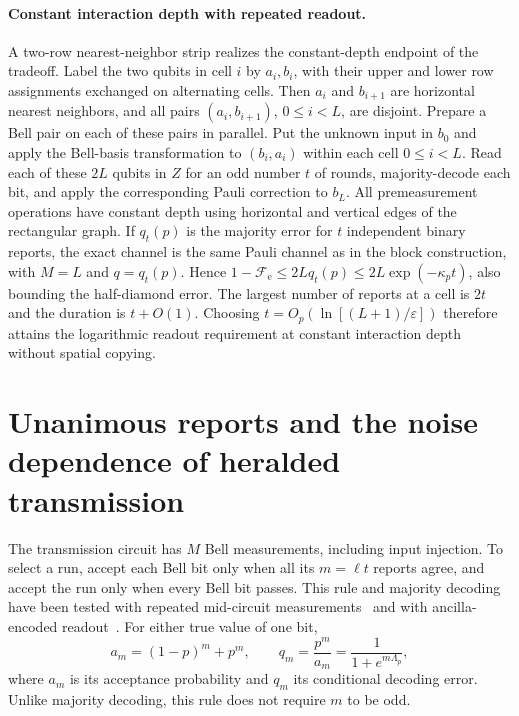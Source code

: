 \documentclass[aps,prl,twocolumn,superscriptaddress,longbibliography,reprint,floatfix]{revtex4-2}
\newcommand{\eps}{\varepsilon}
\newcommand{\Fe}{\mathcal F_{\mathrm e}}
\begin{document}
\paragraph*{Constant interaction depth with repeated readout.}
A two-row nearest-neighbor strip realizes the constant-depth endpoint of
the tradeoff. Label the two qubits in cell $i$ by $a_i,b_i$, with their
upper and lower row assignments exchanged on alternating cells. Then
$a_i$ and $b_{i+1}$ are horizontal nearest neighbors, and all pairs
$(a_i,b_{i+1})$, $0\le i<L$, are disjoint. Prepare a Bell pair on each of
these pairs in parallel. Put the unknown input in $b_0$ and apply the
Bell-basis transformation to $(b_i,a_i)$ within each cell
$0\le i<L$. Read each of these $2L$ qubits in $Z$ for an odd number $t$
of rounds, majority-decode each bit, and apply the corresponding Pauli
correction to $b_L$. All premeasurement operations have constant depth
using horizontal and vertical edges of the rectangular graph.
If $q_t(p)$ is the majority error for $t$ independent binary reports, the
exact channel is the same Pauli channel as in the block construction,
with $M=L$ and $q=q_t(p)$. Hence
$1-\Fe\le2Lq_t(p)\le2L\exp(-\kappa_p t)$, also bounding the
half-diamond error. The largest number of reports at a cell is $2t$ and
the duration is $t+O(1)$. Choosing
$t=O_p(\ln[(L+1)/\eps])$ therefore attains the logarithmic readout
requirement at constant interaction depth without spatial copying.

\FloatBarrier
\section{Unanimous reports and the noise dependence of heralded transmission}
\label{sm:unanimity}

The transmission circuit has $M$ Bell measurements, including input
injection. To select a run, accept each Bell bit only when all its
$m=\ell t$ reports agree, and accept the run only when every Bell bit
passes. This rule and majority decoding have been tested with repeated
mid-circuit measurements~\cite{Koh2026} and with ancilla-encoded
readout~\cite{Czaban2026}. For either true value of one bit,
\begin{equation}
 a_m=(1-p)^m+p^m,\qquad
 q_m=\frac{p^m}{a_m}
     =\frac{1}{1+e^{m\Lambda_p}},
 \label{eq:unanimity-bit}
\end{equation}
where $a_m$ is its acceptance probability and $q_m$ its conditional
decoding error. Unlike majority decoding, this rule does not require
$m$ to be odd.
\end{document}
